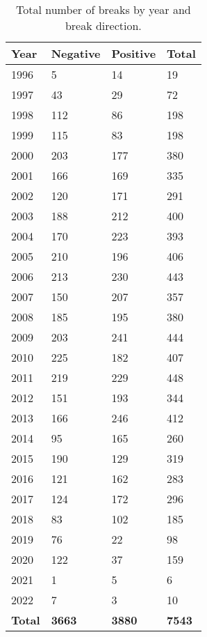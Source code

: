 \documentclass[a4paper]{article}
\begin{document}
\begin{table}[!ht]
    \centering
    \caption{Total number of breaks by year and break direction.}
    \renewcommand{\arraystretch}{1.2}
    \begin{tabular}{llll}
    \hline
        \textbf{Year} & \textbf{Negative} & \textbf{Positive} & \textbf{Total} \\ \hline
        1996 & 5 & 14 & 19 \\ 
        1997 & 43 & 29 & 72 \\ 
        1998 & 112 & 86 & 198 \\ 
        1999 & 115 & 83 & 198 \\ 
        2000 & 203 & 177 & 380 \\ 
        2001 & 166 & 169 & 335 \\ 
        2002 & 120 & 171 & 291 \\ 
        2003 & 188 & 212 & 400 \\ 
        2004 & 170 & 223 & 393 \\ 
        2005 & 210 & 196 & 406 \\ 
        2006 & 213 & 230 & 443 \\ 
        2007 & 150 & 207 & 357 \\ 
        2008 & 185 & 195 & 380 \\ 
        2009 & 203 & 241 & 444 \\ 
        2010 & 225 & 182 & 407 \\ 
        2011 & 219 & 229 & 448 \\ 
        2012 & 151 & 193 & 344 \\ 
        2013 & 166 & 246 & 412 \\ 
        2014 & 95 & 165 & 260 \\ 
        2015 & 190 & 129 & 319 \\ 
        2016 & 121 & 162 & 283 \\ 
        2017 & 124 & 172 & 296 \\ 
        2018 & 83 & 102 & 185 \\ 
        2019 & 76 & 22 & 98 \\ 
        2020 & 122 & 37 & 159 \\ 
        2021 & 1 & 5 & 6 \\ 
        2022 & 7 & 3 & 10 \\ \hline
        \textbf{Total} & \textbf{3663} & \textbf{3880} & \textbf{7543} \\ \hline
    \end{tabular}
    \label{tab:breaks_by_year}
\end{table}
\end{document}
